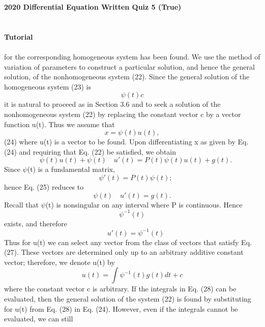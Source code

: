 \documentclass[onecolumn]{IEEEtran}
\begin{document}
{\LARGE \bf { 2020 Differential Equation Written Quiz 5} (True)}
\\\\\\
\bigskip
{\large \bf {Tutorial}}
\bigskip\\
\\
for the corresponding homogeneous system
has been found. We use the method of variation of parameters to construct a particular solution, and hence the general solution, of the nonhomogeneous system (22).
Since the general solution of the homogeneous system (23) is 
\begin{equation}
    \psi(t){c}
\end{equation}
it is natural to
proceed as in Section 3.6 and to seek a solution of the nonhomogeneous system (22)
by replacing the constant vector c by a vector function u(t). Thus we assume that
\begin{equation}
   x= \psi(t)u(t),
\end{equation}                            (24)
where u(t) is a vector to be found. Upon differentiating x as given by Eq. (24) and
requiring that Eq. (22) be satisfied, we obtain
\begin{equation}
 \quad\psi(t)u(t)+\psi(t)\quad u'(t)=P(t)\psi(t)u(t) +g(t).
\end{equation}    
Since $\psi$(t) is a fundamental matrix,
\begin{equation}
 \quad\psi'(t)=P(t)\psi(t);
\end{equation} hence Eq. (25) reduces to
\begin{equation}
 \psi(t)\quad u'(t)=g(t).
\end{equation} 
Recall that $\psi$(t) is nonsingular on any interval where P is continuous. Hence \begin{equation}
 \psi^{-1}(t)
\end{equation} 
exists, and therefore
\begin{equation}
 \quad u'(t)= \psi^{-1}(t)
\end{equation} 
Thus for u(t) we can select any vector from the class of vectors that satisfy Eq. (27).
These vectors are determined only up to an arbitrary additive constant vector;
therefore, we denote u(t) by
\begin{equation}
 u(t)=\int\psi^{-1}(t)g(t)dt+c
\end{equation} 
where the constant vector c is arbitrary. If the integrals in Eq. (28) can be evaluated,
then the general solution of the system (22) is found by substituting for u(t) from
Eq. (28) in Eq. (24). However, even if the integrals cannot be evaluated, we can still
\end{document}
